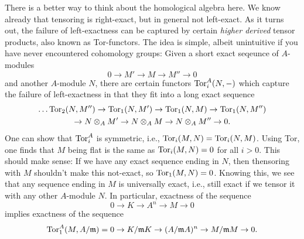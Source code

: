 \documentclass[a4paper,11pt]{article}
\begin{document}
There is a better way to think about the homological algebra here. We know
already that tensoring is right-exact, but in general not left-exact. As it
turns out, the failure of left-exactness can be captured by certain
\textit{higher derived} tensor products, also known as Tor-functors. The idea
is simple, albeit unintuitive if you have never encountered cohomology groups:
Given a short exact seqeunce of $A$-modules
\begin{equation*}
    0 \to M' \to M \to M'' \to 0
\end{equation*}
and another $A$-module $N$, there are certain functors $\operatorname{Tor}_i^A(N,-)$
which capture the failure of left-exactness in that they fit into a long exact
sequence
\begin{multline*}
    \dots \operatorname{Tor}_2(N, M'') \to \operatorname{Tor}_1(N,M') \to \operatorname{Tor}_1(N,M) \to \operatorname{Tor}_1(N,M'') \\ 
    \to N \otimes_A M' \to N \otimes_A M \to N \otimes_A M'' \to 0.
\end{multline*}
One can show that $\operatorname{Tor}_i^A$ is symmetric, i.e., $\operatorname{Tor}_i(M,N) = \operatorname{Tor}_i(N,M)$. 
Using Tor, one finds that $M$ being flat is the same as $\operatorname{Tor}_i(M, N) = 0$
for all $i > 0$. This should make sense: If we have any exact sequence 
ending in $N$, then thensoring with $M$ shouldn't make this not-exact, so 
$\operatorname{Tor}_1(M,N) = 0$. Knowing this, we see that any sequence ending in $M$ is
universally exact, i.e., still exact if we tensor it with any other $A$-module 
$N$. In particular, exactness of the sequence
\begin{equation*}
    0 \to K \to A^n \to M \to 0
\end{equation*}
implies exactness of the sequence
\begin{equation*}
    \operatorname{Tor}_1^A(M, A/\mathfrak{m}) = 0 \to K/ \mathfrak{m} K \to (A/\mathfrak{m} A)^n \to M/\mathfrak{m} M \to 0.
\end{equation*}



\contactend
\end{document}
